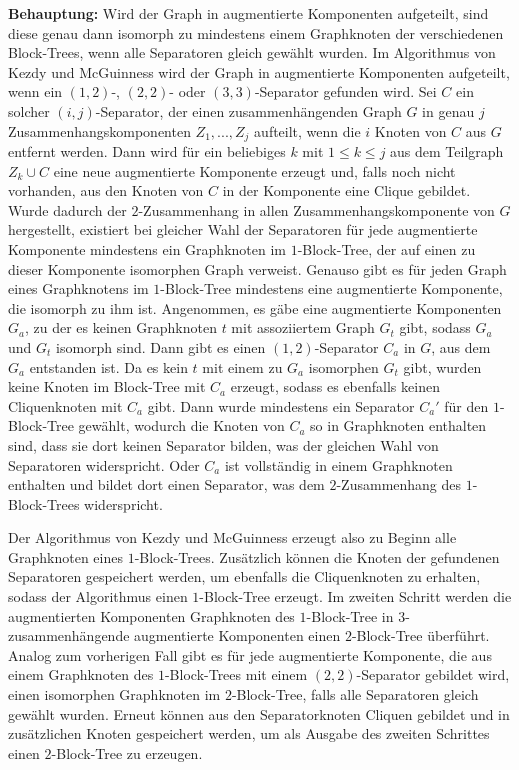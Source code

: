 \textbf{Behauptung:} Wird der Graph in augmentierte Komponenten aufgeteilt, sind diese genau dann isomorph zu mindestens einem Graphknoten der verschiedenen Block-Trees, wenn alle Separatoren gleich gewählt wurden.
Im Algorithmus von Kezdy und McGuinness wird der Graph in augmentierte Komponenten aufgeteilt, wenn ein $(1, 2)$-, $(2, 2)$- oder $(3, 3)$-Separator gefunden wird.
Sei $C$ ein solcher $(i, j)$-Separator, der einen zusammenhängenden Graph $G$ in genau $j$ Zusammenhangskomponenten $Z_1, ..., Z_j$ aufteilt, wenn die $i$ Knoten von $C$ aus $G$ entfernt werden.
Dann wird für ein beliebiges $k$ mit $1 \leq k \leq j$ aus dem Teilgraph $Z_k \cup C$ eine neue augmentierte Komponente erzeugt und, falls noch nicht vorhanden, aus den Knoten von $C$ in der Komponente eine Clique gebildet.
Wurde dadurch der $2$-Zusammenhang in allen Zusammenhangskomponente von $G$ hergestellt, existiert bei gleicher Wahl der Separatoren für jede augmentierte Komponente mindestens ein Graphknoten im $1$-Block-Tree, der auf einen zu dieser Komponente isomorphen Graph verweist.
Genauso gibt es für jeden Graph eines Graphknotens im $1$-Block-Tree mindestens eine augmentierte Komponente, die isomorph zu ihm ist.
Angenommen, es gäbe eine augmentierte Komponenten $G_a$, zu der es keinen Graphknoten $t$ mit assoziiertem Graph $G_t$ gibt, sodass $G_a$ und $G_t$ isomorph sind.
Dann gibt es einen $(1, 2)$-Separator $C_a$ in $G$, aus dem $G_a$ entstanden ist.
Da es kein $t$ mit einem zu $G_a$ isomorphen $G_t$ gibt, wurden keine Knoten im Block-Tree mit $C_a$ erzeugt, sodass es ebenfalls keinen Cliquenknoten mit $C_a$ gibt.
Dann wurde mindestens ein Separator $C_a'$ für den $1$-Block-Tree gewählt, wodurch die Knoten von $C_a$ so in Graphknoten enthalten sind, dass sie dort keinen Separator bilden, was der gleichen Wahl von Separatoren widerspricht.
Oder $C_a$ ist vollständig in einem Graphknoten enthalten und bildet dort einen Separator, was dem $2$-Zusammenhang des $1$-Block-Trees widerspricht.

Der Algorithmus von Kezdy und McGuinness erzeugt also zu Beginn alle Graphknoten eines $1$-Block-Trees.
Zusätzlich können die Knoten der gefundenen Separatoren gespeichert werden, um ebenfalls die Cliquenknoten zu erhalten, sodass der Algorithmus einen $1$-Block-Tree erzeugt.
Im zweiten Schritt werden die augmentierten Komponenten \bzw Graphknoten des $1$-Block-Tree in $3$-zusammenhängende augmentierte Komponenten \bzw einen $2$-Block-Tree überführt.
Analog zum vorherigen Fall gibt es für jede augmentierte Komponente, die aus einem Graphknoten des $1$-Block-Trees mit einem $(2, 2)$-Separator gebildet wird, einen isomorphen Graphknoten im $2$-Block-Tree, falls alle Separatoren gleich gewählt wurden.
Erneut können aus den Separatorknoten Cliquen gebildet und in zusätzlichen Knoten gespeichert werden, um als Ausgabe des zweiten Schrittes einen $2$-Block-Tree zu erzeugen.

